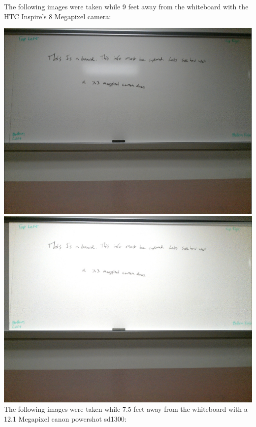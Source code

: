\documentclass[]{article}
\begin{document}
		The following images were taken while 9 feet away from the whiteboard with the HTC Inspire's 8 Megapixel camera: 
		
		\includegraphics{images/UnmodifiedPhoneClose.jpg} \\
		\includegraphics{images/ModifiedPhoneClose.jpg} \\
		
		The following images were taken while 7.5 feet away from the whiteboard with a 12.1 Megapixel canon powershot sd1300:
		
\end{document}
